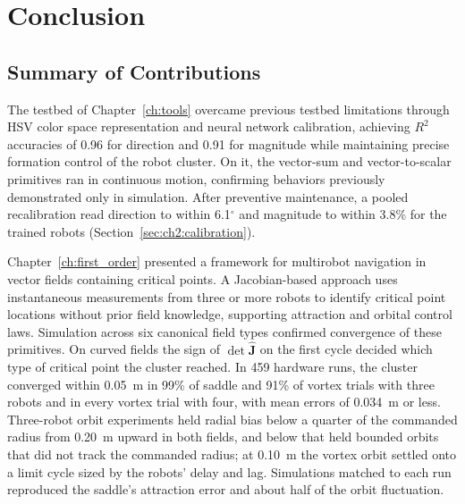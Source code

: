 \chapter{Conclusion}
\label{ch:conclusion}

\section{Summary of Contributions}
\label{sec:ch10:summary}

The testbed of Chapter~\ref{ch:tools} overcame previous testbed
limitations through HSV color space representation and neural network
calibration, achieving $R^2$ accuracies of 0.96 for direction and 0.91 for
magnitude while maintaining precise formation control of the robot
cluster. On it, the vector-sum and vector-to-scalar primitives ran in
continuous motion, confirming behaviors previously demonstrated only in
simulation. After preventive maintenance, a pooled recalibration read
direction to within 6.1$^\circ$ and magnitude to within 3.8\% for the
trained robots (Section~\ref{sec:ch2:calibration}).

Chapter~\ref{ch:first_order} presented a framework for multirobot navigation in vector fields containing critical points. A Jacobian-based approach uses instantaneous measurements from three or more robots to identify critical point locations without prior field knowledge, supporting attraction and orbital control laws. Simulation across six canonical field types confirmed convergence of these primitives. On curved fields the sign of $\det\hat{\mathbf{J}}$ on the first cycle decided which type of critical point the cluster reached. In 459 hardware runs, the cluster converged within 0.05~m in 99\% of saddle and 91\% of vortex trials with three robots and in every vortex trial with four, with mean errors of 0.034~m or less. Three-robot orbit experiments held radial bias below a quarter of the commanded radius from 0.20~m upward in both fields, and below that held bounded orbits that did not track the commanded radius; at 0.10~m the vortex orbit settled onto a limit cycle sized by the robots' delay and lag. Simulations matched to each run reproduced the saddle's attraction error and about half of the orbit fluctuation.

